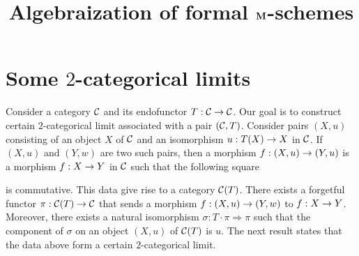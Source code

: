 

\usepackage{todonotes}
\newcommand{\lstodo}[1]{\todo[color=green!40,bordercolor=green,size=\footnotesize]{\textbf{LS TODO: }#1}}



\title{Algebraization of formal $\mathbf{M}$-schemes}
\date{}
\maketitle

\section{Some $2$-categorical limits}
\noindent
Consider a category ${\mathcal C}$ and its endofunctor $T:{\mathcal C}\rightarrow {\mathcal C}$. Our goal is to construct certain $2$-categorical limit associated with a pair $({\mathcal C},T)$. Consider pairs $\left(X,u\right)$ consisting of an object $X$ of ${\mathcal C}$ and an isomorphism $u:T(X)\rightarrow X$ in ${\mathcal C}$. If $\left(X,u\right)$ and $\left(Y,w\right)$ are two such pairs, then a morphism $f:(X,u) \rightarrow (Y,u)$ is a morphism $f:X\rightarrow Y$ in ${\mathcal C}$ such that the following square
\begin{center}
\end{center}
is commutative. This data give rise to a category ${\mathcal C}(T)$. There exists a forgetful functor $\pi:{\mathcal C}(T)\rightarrow {\mathcal C}$ that sends a morphism $f:(X,u)\rightarrow (Y,w)$ to $f:X\rightarrow Y$. Moreover, there exists a natural isomorphism $\sigma:T\cdot \pi \Rightarrow \pi$ such that the component of $\sigma$ on an object $(X,u)$ of ${\mathcal C}(T)$ is $u$. The next result states that the data above form a certain $2$-categorical limit.


